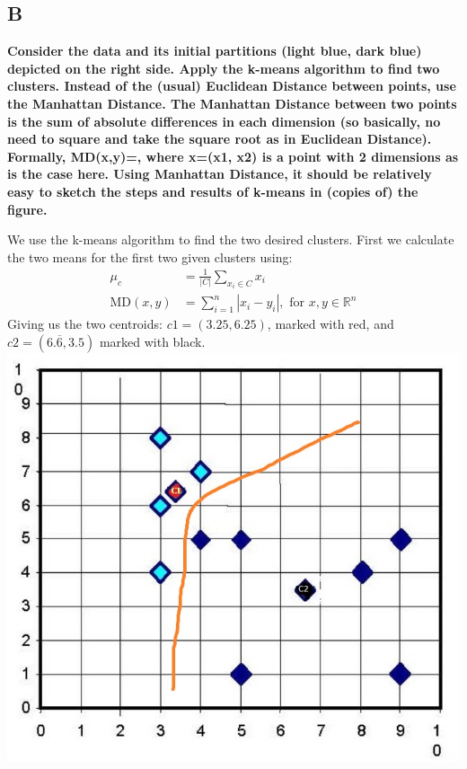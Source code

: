 \documentclass{article}
\theoremstyle{remark}
\begin{document}
	\subsection{B}
	\textbf{Consider the data and its initial partitions (light blue, dark blue) depicted on the right side. Apply the k-means algorithm to find two clusters. Instead of the (usual) Euclidean Distance between points, use the Manhattan Distance. The Manhattan Distance between two points is the sum of absolute differences in each dimension (so basically, no need to square and take the square root as in Euclidean Distance). Formally, MD(x,y)=, where x=(x1, x2) is a point with 2 dimensions as is the case here. Using Manhattan Distance, it should be relatively easy to sketch the steps and results of k-means in (copies of) the figure.}
	
	
	We use the k-means algorithm to find the two desired clusters. First we calculate the two means for the first two given clusters using: 
	\begin{align*}
	\mu_c&=\frac{1}{|C|} \sum_{x_i \in C}x_i\\
	\text{MD}(x,y) &= \sum_{i=1}^n |x_i-y_i|, \text{ for }x,y\in\mathbb{R}^n
	\end{align*}
	Giving us the two centroids: $c1=(3.25,6.25)$, marked with red, and $c2=(6.\overline{6},3.5)$ marked with black.\\
	\includegraphics[scale = 0.5]{centroids1.jpg}\\
\end{document}
